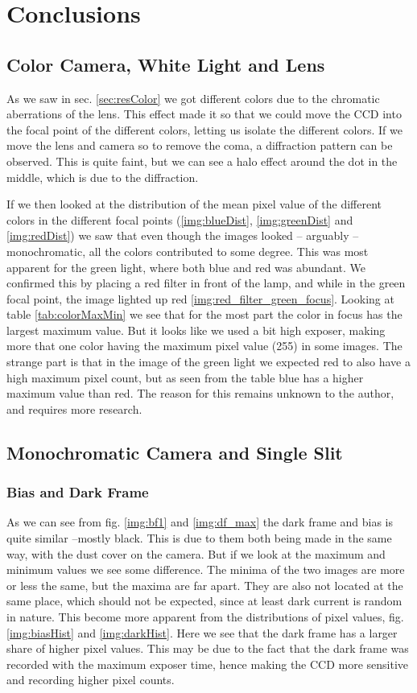 \documentclass{emulateapj}
\begin{document}
\section{Conclusions}
\label{sec:conclusions}

\subsection{Color Camera, White Light and Lens}
As we saw in sec. \ref{sec:resColor} we got different colors due to the chromatic aberrations of the lens. This effect made it so that we could move the CCD into the focal point of the different colors, letting us isolate the different colors. If we move the lens and camera so to remove the coma, a diffraction pattern can be observed. This is quite faint, but we can see a halo effect around the dot in the middle, which is due to the diffraction.

 If we then looked at the distribution of the mean pixel value of the different colors in the different focal points (\ref{img:blueDist}, \ref{img:greenDist} and \ref{img:redDist}) we saw that even though the images looked -- arguably -- monochromatic, all the colors contributed to some degree. This was most apparent for the green light, where both blue and red was abundant. We confirmed this by placing a red filter in front of the lamp, and while in the green focal point, the image lighted up red \ref{img:red_filter_green_focus}. Looking at table \ref{tab:colorMaxMin} we see that for the most part the color in focus has the largest maximum value. But it looks like we used a bit high exposer, making more that one color having the maximum pixel value (255) in some images. The strange part is that in the image of the green light we expected red to also have a high maximum pixel count, but as seen from the table blue has a higher maximum value than red. The reason for this remains unknown to the author, and requires more research.

\subsection{Monochromatic Camera and Single Slit}
\subsubsection{Bias and Dark Frame}
As we can see from fig. \ref{img:bf1} and \ref{img:df_max} the dark frame and bias is quite similar --mostly black. This is due to them both being made in the same way, with the dust cover on the camera. But if we look at the maximum and minimum values we see some difference. The minima of the two images are more or less the same, but the maxima are far apart. They are also not located at the same place, which should not be expected, since at least dark current is random in nature. This become more apparent from the distributions of pixel values, fig. \ref{img:biasHist} and \ref{img:darkHist}. Here we see that the dark frame has a larger share of higher pixel values. This may be due to the fact that the dark frame was recorded with the maximum exposer time, hence making the CCD more sensitive and recording higher pixel counts.
\end{document}
